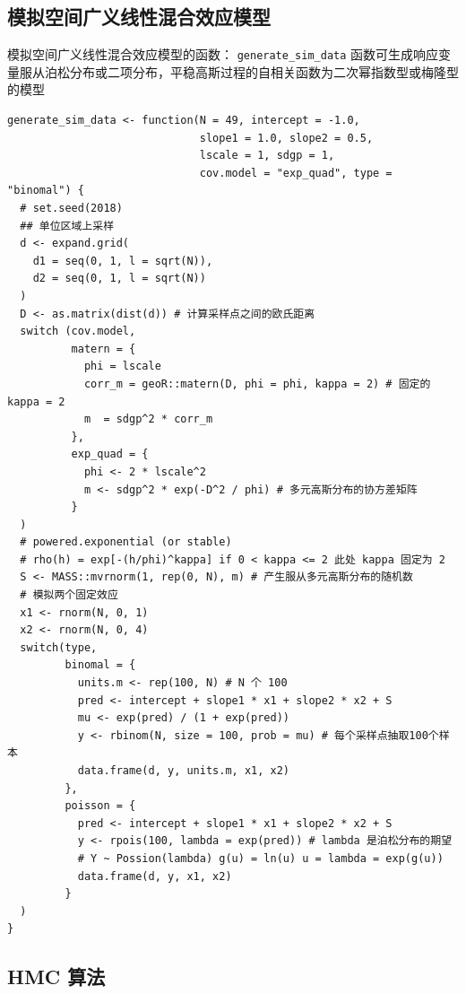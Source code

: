 \documentclass[12pt,a4paper,UTF8,twoside]{book}
\theoremstyle{definition}
\theoremstyle{definition}
\theoremstyle{definition}
\theoremstyle{remark}
\begin{document}
\hypertarget{simulate-SGLMM-code}{%
\subsection*{模拟空间广义线性混合效应模型}\label{simulate-SGLMM-code}}

模拟空间广义线性混合效应模型的函数： \texttt{generate\_sim\_data}
函数可生成响应变量服从泊松分布或二项分布，平稳高斯过程的自相关函数为二次幂指数型或梅隆型的模型

\begin{verbatim}
generate_sim_data <- function(N = 49, intercept = -1.0, 
                              slope1 = 1.0, slope2 = 0.5,
                              lscale = 1, sdgp = 1, 
                              cov.model = "exp_quad", type = "binomal") {
  # set.seed(2018) 
  ## 单位区域上采样
  d <- expand.grid(
    d1 = seq(0, 1, l = sqrt(N)),
    d2 = seq(0, 1, l = sqrt(N))
  )
  D <- as.matrix(dist(d)) # 计算采样点之间的欧氏距离
  switch (cov.model,
          matern = {
            phi = lscale
            corr_m = geoR::matern(D, phi = phi, kappa = 2) # 固定的 kappa = 2 
            m  = sdgp^2 * corr_m 
          },
          exp_quad = {
            phi <- 2 * lscale^2
            m <- sdgp^2 * exp(-D^2 / phi) # 多元高斯分布的协方差矩阵
          }
  )
  # powered.exponential (or stable)
  # rho(h) = exp[-(h/phi)^kappa] if 0 < kappa <= 2 此处 kappa 固定为 2
  S <- MASS::mvrnorm(1, rep(0, N), m) # 产生服从多元高斯分布的随机数
  # 模拟两个固定效应
  x1 <- rnorm(N, 0, 1)
  x2 <- rnorm(N, 0, 4)
  switch(type,
         binomal = {
           units.m <- rep(100, N) # N 个 100
           pred <- intercept + slope1 * x1 + slope2 * x2 + S
           mu <- exp(pred) / (1 + exp(pred))
           y <- rbinom(N, size = 100, prob = mu) # 每个采样点抽取100个样本
           data.frame(d, y, units.m, x1, x2)
         },
         poisson = {
           pred <- intercept + slope1 * x1 + slope2 * x2 + S
           y <- rpois(100, lambda = exp(pred)) # lambda 是泊松分布的期望  
           # Y ~ Possion(lambda) g(u) = ln(u) u = lambda = exp(g(u))
           data.frame(d, y, x1, x2)
         }
  )
}
\end{verbatim}

\hypertarget{HMC-Algrithms}{%
\subsection*{HMC 算法}\label{HMC-Algrithms}}
\end{document}
